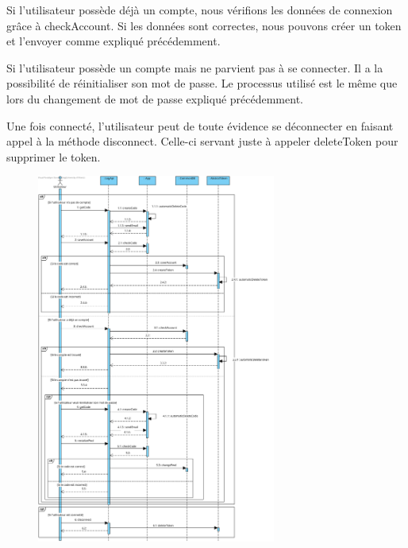 \begin{flushleft}
Si l'utilisateur possède déjà un compte, nous vérifions les données de connexion grâce à checkAccount. Si les données sont correctes, nous pouvons créer un token et l'envoyer comme expliqué précédemment.
\end{flushleft}

\begin{flushleft}
Si l'utilisateur possède un compte mais ne parvient pas à se connecter. Il a la possibilité de réinitialiser son mot de passe. Le processus utilisé est le même que lors du changement de mot de passe expliqué précédemment.
\end{flushleft}

\begin{flushleft}
Une fois connecté, l'utilisateur peut de toute évidence se déconnecter en faisant appel à la méthode disconnect. Celle-ci servant juste à appeler deleteToken pour supprimer le token.
\end{flushleft}

\newpage
\begin{figure}[h]
\centering
\includegraphics[width = 0.7\textwidth]{Base/sequence/img/common/Sauthentifier.png}
\end{figure}

